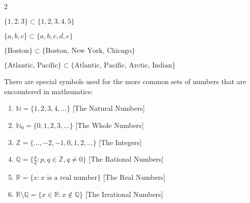 \documentclass[crop=false,class=article,oneside]{standalone}
\begin{document}
        \begin{example}
            \
            \begin{enumerate}
            \end{enumerate}
        \end{example}
        \begin{notation}
            There are special symbols used for the more common sets of
            numbers that are encountered in mathematics:
            \begin{enumerate}
                \item $\mathbb{N}=\{1,2,3,4,\hdots\}$
                      \hfill[The Natural Numbers]
                \item $\mathbb{N}_{0}=\{0,1,2,3,\hdots\}$
                      \hfill[The Whole Numbers]
                \item $\mathbb{Z}=\{\hdots,-2,-1,0,1,2,\hdots\}$
                      \hfill[The Integers]
                \item $\mathbb{Q}=\{\frac{p}{q}:p,q\in\mathbb{Z},q\ne{0}\}$
                      \hfill[The Rational Numbers]
                \item $\mathbb{R}=\{x:x\textrm{ is a real number}\}$
                      \hfill [The Real Numbers]
                \item $\mathbb{R}\setminus\mathbb{Q}%
                       =\{x\in\mathbb{R}:x\notin\mathbb{Q}\}$
                      \hfill[The Irrational Numbers]
            \end{enumerate}
        \end{notation}
\end{document}
